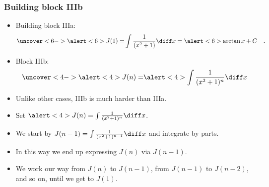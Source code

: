 \begin{frame}
\frametitle{Building block IIIb}
\begin{itemize}
\item<1-> Building block IIIa: \[
\uncover<6->{\alert<6>{J(1)=}} \int \frac{1}{(x^2+1)}\diff x=\alert<6>{\arctan x+C}\quad .
\] 
\item<2-> Block IIIb:
\[
\uncover<4->{\alert<4>{J(n)=}} \alert<4>{\int \frac{1}{(x^2+1)^n}\diff x}
\] 
\item<3-> Unlike other cases, IIIb is much harder than IIIa.
\item<4-> Set $\alert<4>{J(n)=\int \frac{1}{(x^2+1)^n}\diff x}$.  
\item<7-> We start by $J(n-1) =\int \frac{1}{(x^2+1)^{n-1}} \diff x$ and integrate by parts.
\item<8-> In this way we end up expressing $J(n)$ via $J(n-1)$.
\item<9-> We work our way from $J(n)$ to $J(n-1)$, from $J(n-1)$ to $J(n-2)$, and so on, until we get to $J(1)$.
\end{itemize} 
\end{frame}

